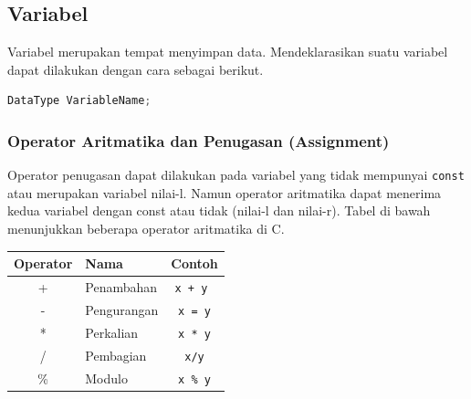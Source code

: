 \subsection{Variabel}
Variabel merupakan tempat menyimpan data. Mendeklarasikan suatu variabel dapat dilakukan dengan cara sebagai berikut.
\begin{lstlisting}[language=c,caption=Deklarasi Variabel C,label=lst:deklarasivariabel,captionpos=t]
DataType VariableName;
\end{lstlisting}
\subsubsection{Operator Aritmatika dan Penugasan (Assignment)}
Operator penugasan dapat dilakukan pada variabel yang tidak mempunyai \verb*|const| atau merupakan variabel nilai-l. Namun operator aritmatika dapat menerima kedua variabel dengan const atau tidak (nilai-l dan nilai-r).
Tabel di bawah menunjukkan beberapa operator aritmatika di C.
\begin{center}
	\begin{tabular}{|c|l|c|}
		\hline
		\multicolumn{1}{|l|}{\textbf{Operator}} & \textbf{Nama} & \multicolumn{1}{l|}{\textbf{Contoh}} \\ \hline
		+  & Penambahan &\verb|x + y |  \\ \hline
		-  & Pengurangan &\verb|x = y|   \\ \hline
		*  & Perkalian   & \verb|x * y|  \\ \hline
		/  & Pembagian   & \verb|x/y|  \\ \hline
		\% & Modulo     & \verb|x % y| \\ \hline
	\end{tabular}
\end{center}

